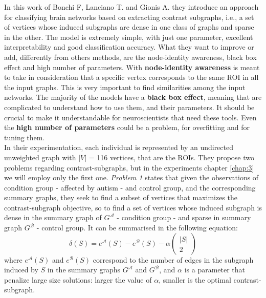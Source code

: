 In this work of Bonchi F, Lanciano T. and Gionis A. \cite{lanciano2020cs} they introduce an approach for classifying brain networks based on extracting contrast subgraphs, i.e., a set of vertices whose induced subgraphs are dense in one class of graphs and sparse in the other. The model is extremely simple, with just one parameter, excellent interpretability and good classification accuracy. What they want to improve or add, differently from others methods, are the node-identity awareness, black box effect and high number of parameters. With \textbf{node-identity awareness} is meant to take in consideration that a specific vertex corresponds to the same ROI in all the input graphs. This is very important to find similarities among the input networks. The majority of the models have a \textbf{black box effect}, meaning that are complicated to understand how to use them, and their parameters. It should be crucial to make it understandable for neuroscientists that need these tools. Even the \textbf{high number of parameters} could be a problem, for overfitting and for tuning them. 
\\

In their experimentation, each individual is represented by an undirected unweighted graph with $|V|$ = 116 vertices, that are the ROIs. They propose two problems regarding contrast-subgraphs, but in the experiments chapter \ref{chap:3} we will employ only the first one. \textit{Problem 1} states that given the observations of condition group - affected by autism - and control group, and the corresponding summary graphs, they seek to find a subset of vertices that maximizes the contrast-subgraph objective, so to find a set of vertices whose induced subgraph is dense in the summary graph of $G^{\mathcal{A}}$ - condition group - and sparse in summary graph $G^{\mathcal{B}}$ - control group. It can be summarised in the following equation:
\begin{equation}
	\delta(S)=e^{\mathcal{A}}(S)-e^{\mathcal{B}}(S)-\alpha\left(\begin{array}{c}
		|S| \\
		2
	\end{array}\right)
\end{equation}
where $ e^{\mathcal{A}}(S) $ and $ e^{\mathcal{B}}(S) $ correspond to the number of edges in the subgraph induced by $ S $ in the summary graphs $G^{\mathcal{A}}$ and $G^{\mathcal{B}}$, and $ \alpha $ is a parameter that penalize large size solutions: larger the value of $\alpha$, smaller is the optimal contrast-subgraph. 
\\

